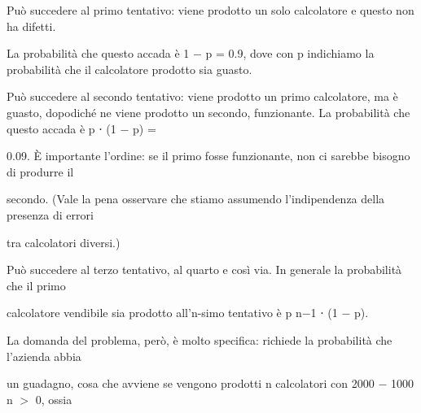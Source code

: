 \documentclass[a4paper,portrait,12pt]{article}
\begin{document}
\begin{flushleft}
Pu\`{o} succedere al primo tentativo: viene prodotto un solo calcolatore e questo non ha difetti.
\end{flushleft}


\begin{flushleft}
La probabilit\`{a} che questo accada \`{e} 1 $-$ p = 0.9, dove con p indichiamo la probabilit\`{a} che il calcolatore prodotto sia guasto.
\end{flushleft}


\begin{flushleft}
Pu\`{o} succedere al secondo tentativo: viene prodotto un primo calcolatore, ma \`{e} guasto, dopodich\'{e} ne viene prodotto un secondo, funzionante. La probabilit\`{a} che questo accada \`{e} p ⋅ (1 $-$ p) =
\end{flushleft}


\begin{flushleft}
0.09. \`{E} importante l'ordine: se il primo fosse funzionante, non ci sarebbe bisogno di produrre il
\end{flushleft}


\begin{flushleft}
secondo. (Vale la pena osservare che stiamo assumendo l'indipendenza della presenza di errori
\end{flushleft}


\begin{flushleft}
tra calcolatori diversi.)
\end{flushleft}


\begin{flushleft}
Pu\`{o} succedere al terzo tentativo, al quarto e così via. In generale la probabilit\`{a} che il primo
\end{flushleft}


\begin{flushleft}
calcolatore vendibile sia prodotto all'n-simo tentativo \`{e} p n$-$1 ⋅ (1 $-$ p).
\end{flushleft}


\begin{flushleft}
La domanda del problema, per\`{o}, \`{e} molto specifica: richiede la probabilit\`{a} che l'azienda abbia
\end{flushleft}


\begin{flushleft}
un guadagno, cosa che avviene se vengono prodotti n calcolatori con 2000 $-$ 1000 n $>$ 0, ossia
\end{flushleft}
\end{document}
